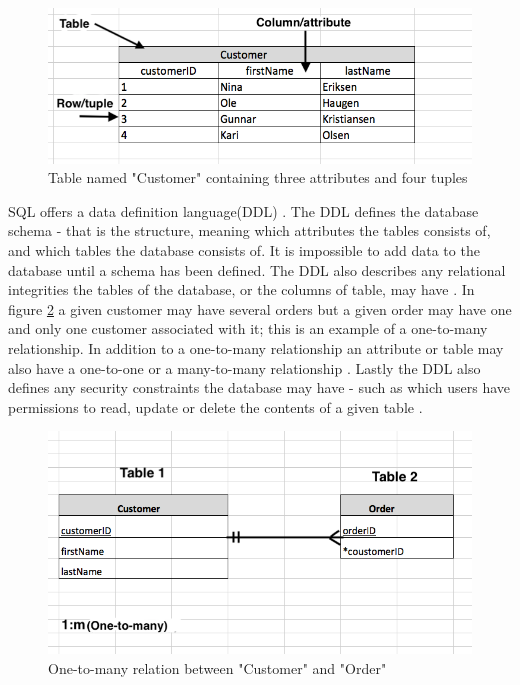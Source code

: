 \begin{figure}
    \centering
    \includegraphics[width=115mm,scale=1]{figures/relational-db-visualised.png}
    \caption{Table named "Customer" containing three attributes and four tuples}
    \label{fig:relational-db-visualised}
\end{figure}

SQL offers a data definition language(DDL) \cite{sql-components}.
The DDL defines the database schema - that is the structure, meaning which attributes the tables consists of, and which tables the database consists of.
It is impossible to add data to the database until a schema has been defined.
The DDL also describes any relational integrities the tables of the database, or the columns of table, may have \cite{sql-constraints}.
In figure \ref{fig:relational-db-relation} a given customer may have several orders but a given order may have one and only one customer associated with it; this is an example of a one-to-many relationship.
In addition to a one-to-many relationship an attribute or table may also have a one-to-one or a many-to-many relationship \cite{sql-relationships}.
Lastly the DDL also defines any security constraints the database may have - such as which users have permissions to read, update or delete the contents of a given table \cite{sql-ddl}.

\begin{figure}
    \centering
    \includegraphics[width=115mm,scale=1]{figures/relational-db-relation.png}
    \caption{One-to-many relation between "Customer" and "Order"}
    \label{fig:relational-db-relation}
\end{figure}

